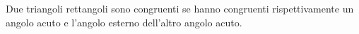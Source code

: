 Due triangoli rettangoli sono congruenti se hanno 
congruenti rispettivamente un angolo acuto e l'angolo esterno
dell'altro angolo acuto.